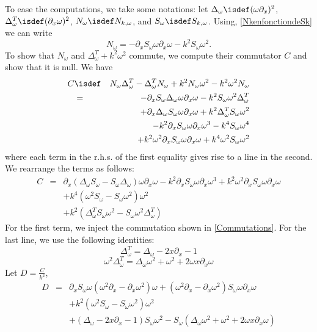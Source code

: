 \documentclass[a4paper]{article}
\begin{document}
	To ease the computations, we take some notations: let $\Delta_\omega \isdef (\omega \partial_x)^2$, $\Delta_\omega^T \isdef (\partial_x \omega)^2$,  $N_\omega \isdef N_{k,\omega}$, and $S_\omega \isdef S_{k,\omega}$. Using, \autoref{NkenfonctiondeSk} we can write 
	\[N_\omega = -\partial_x S_\omega \omega \partial_x \omega - k^2 S_\omega \omega^2.\]
	To show that $N_\omega$ and $\Delta_\omega^T + k^2\omega^2$ commute, we compute their commutator $C$ and show that it is null. 
	We have 
	\begin{eqnarray*}
		C &\isdef& N_\omega \Delta_\omega^T - \Delta_\omega^T N_\omega + k^2N_\omega \omega^2 - k^2 \omega^2 N_\omega \\
		&=& -\partial_x S_\omega \Delta_\omega \omega \partial_x \omega  - k^2 S_\omega \omega^2 \Delta_\omega^T \\
		&& + \partial_x \Delta_\omega S_\omega \omega \partial_x \omega + k^2 \Delta_\omega^T S_\omega \omega^2 \\
		&& - k^2 \partial_x S_\omega \omega \partial_x \omega^3 - k^4 S_\omega \omega^4 \\
		&& + k^2 \omega^2 \partial_x S_\omega \omega \partial_x \omega + k^4 \omega^2 S_\omega \omega^2
	\end{eqnarray*}
	where each term in the r.h.s. of the first equality gives rise to a line in the second. We rearrange the terms as follows:
	\begin{eqnarray*}
		C &=& \partial_x (\Delta_\omega S_\omega - S_\omega \Delta_\omega) \omega \partial_x \omega - k^2 \partial_x S_\omega \omega \partial_x \omega^3 + k^2 \omega^2 \partial_x S_\omega \omega\partial_x \omega\\	
		&& + k^4 (\omega^2 S_\omega - S_\omega \omega^2) \omega^2\\
		&& + k^2(\Delta_\omega^T S_\omega \omega^2 - S_\omega \omega^2 \Delta_\omega^T)
	\end{eqnarray*}
	For the first term, we inject the commutation shown in \autoref{Commutations}. For the last line, we use the following identities: 
	\[ \Delta_\omega^T = \Delta_\omega - 2x \partial_x - 1\]
	\[ \omega^2 \Delta_\omega^T = \Delta_\omega \omega^2 + \omega^2 + 2 \omega x \partial_x \omega\]
	Let $D = \frac{C}{k^2}$, 
	\begin{eqnarray*}
		D &=& \partial_x S_\omega \omega (\omega^2\partial_x - \partial_x \omega^2) \omega  + (\omega^2 \partial_x - \partial_x \omega^2)S_\omega \omega \partial_x \omega\\
		&&+ k^2(\omega^2 S_\omega - S_\omega \omega^2) \omega^2\\
		&&+ (\Delta_\omega - 2x \partial_x - 1)S_\omega \omega^2 - S_\omega(\Delta_\omega \omega^2 + \omega^2 + 2\omega x \partial_x \omega) 
	\end{eqnarray*}
\end{document}
